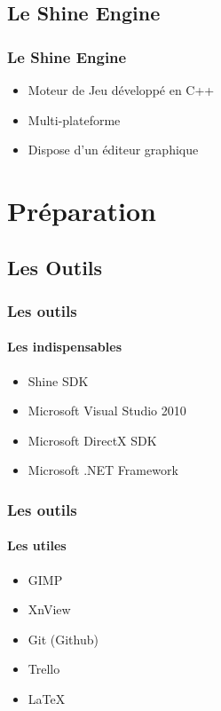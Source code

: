 \documentclass[12pt]{beamer}
\begin{document}
\subsection{Le Shine Engine}
\begin{frame}
\frametitle{Le Shine Engine}
\begin{itemize}
\item
Moteur de Jeu développé en C++
\item
Multi-plateforme 
\item
Dispose d'un éditeur graphique

\end{itemize}

\end{frame}



\section{Préparation}
\subsection{Les Outils}
\begin{frame}
\frametitle{Les outils}
\framesubtitle{Les indispensables}


\begin{itemize}
\item
Shine SDK
\item
Microsoft Visual Studio 2010
\item
Microsoft DirectX SDK
\item
Microsoft .NET Framework

\end{itemize}

\end{frame}
\begin{frame}
\frametitle{Les outils}
\framesubtitle{Les utiles}

\begin{itemize}
\item
GIMP
\item
XnView
\item
Git (Github)
\item
Trello
\item
\LaTeX
\end{itemize}

\end{frame}
\end{document}

